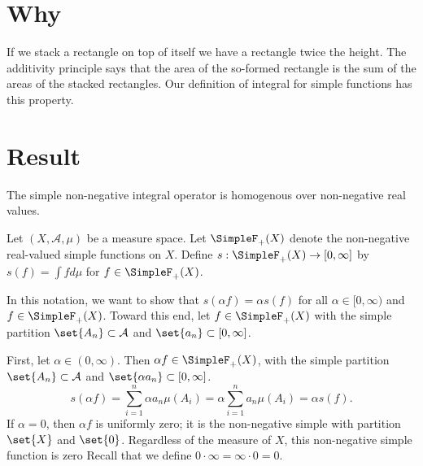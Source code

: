 

\section*{Why}

If we stack a rectangle on top of itself we have a rectangle twice the height.
The additivity principle says that the area of the so-formed rectangle is the sum of the areas of the stacked rectangles.
Our definition of integral for simple functions has this property.

\section*{Result}

\begin{proposition}
The simple non-negative integral operator is homogenous over non-negative real values.
\end{proposition}
Let $(X, \mathcal{A} , \mu )$ be a measure space.
Let $\SimpleF_+(X)$ denote the non-negative real-valued simple functions on $X$.
Define $s: \SimpleF_+(X) \to [0, \infty]$ by $s(f) = \int f d\mu $ for $f \in \SimpleF_+(X)$.

In this notation, we want to show that $s(\alpha  f) = \alpha s(f)$ for all $\alpha  \in [0, \infty)$ and $f \in \SimpleF_+(X)$.
Toward this end, let $f \in \SimpleF_+(X)$ with the simple partition $\set{A_n} \subset \mathcal{A} $ and $\set{a_n} \subset [0, \infty]$.



First, let
$\alpha  \in (0, \infty)$.
Then $\alpha  f \in \SimpleF_+(X)$,
with the simple partition
$\set{A_n} \subset \mathcal{A} $
and $\set{\alpha  a_n} \subset [0, \infty]$.
    \[
s(\alpha  f) = \sum_{i = 1}^{n} \alpha  a_n \mu (A_i)
= \alpha  \sum_{i = 1}^{n} a_n \mu (A_i)
= \alpha  s(f).
    \]
If $\alpha  = 0$, then $\alpha  f$ is uniformly
zero; it is the non-negative simple
with partition $\set{X}$ and $\set{0}$.
Regardless of the measure of $X$,
this non-negative simple function is zero
Recall that we define
$0 \cdot  \infty = \infty \cdot  0 = 0$.

\blankpage
